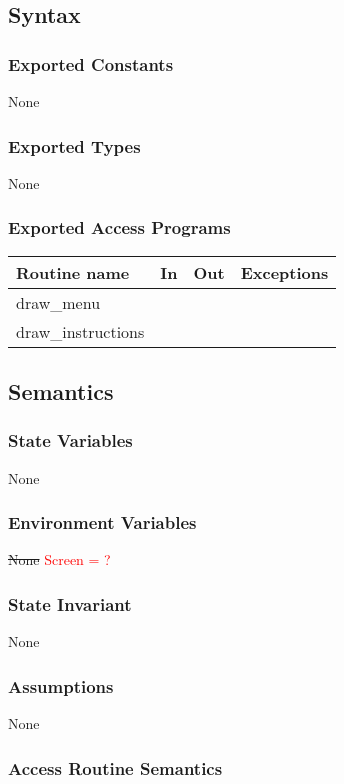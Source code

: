 \documentclass[12pt]{article}
\begin{document}
\subsection* {Syntax}

\subsubsection* {Exported Constants}
None
\subsubsection* {Exported Types}
None
\subsubsection* {Exported Access Programs}

\begin{tabular}{| l | l | l | l |}
\hline
\textbf{Routine name} & \textbf{In} & \textbf{Out} & \textbf{Exceptions}\\
\hline
draw\_menu &  &  &  \\
\hline
draw\_instructions & & & \\
\hline

\hline
\end{tabular}

\subsection* {Semantics}

\subsubsection* {State Variables}
None

\subsubsection* {Environment Variables}
\sout{None}
\textcolor{red}{Screen = ?}
\subsubsection* {State Invariant}
None


\subsubsection* {Assumptions}
None

\subsubsection* {Access Routine Semantics}
\end{document}
